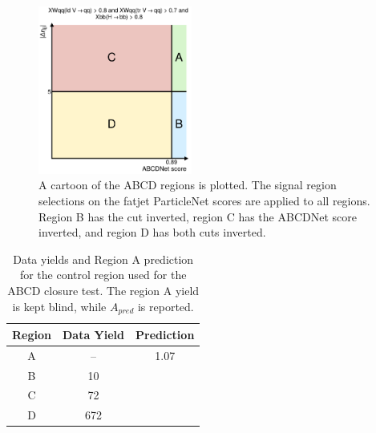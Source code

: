 \begin{figure}[htb]
    \centering
    \includegraphics[width=0.45\textwidth]{fig/vbsvvh/ABCD_abcdnet_score_gt_0p89_vs_abs_deta_jj_gt_5p0.pdf}
    \caption{
        A cartoon of the ABCD regions is plotted. 
        The signal region selections on the fatjet ParticleNet scores are applied to all regions. 
        Region B has the \detajj cut inverted, region C has the ABCDNet score inverted, and region D has both cuts inverted. 
    }
    \label{fig:vbsvvh_abcd}
\end{figure}

\begin{table}[htbp]
    \begin{center}

    \begin{tabular}{ccc}
    \toprule
    \textbf{Region} & Data Yield & Prediction \\
    \midrule
    A               & --         & 1.07       \\
    B               & 10         &            \\
    C               & 72         &            \\
    D               & 672        &            \\
    \bottomrule
    \end{tabular}

    \end{center}
    \caption{
        Data yields and Region A prediction for the control region used for the ABCD closure test. 
        The region A yield is kept blind, while $A_{pred}$ is reported.
    }
    \label{table:0lepABCDregion}

\end{table}


